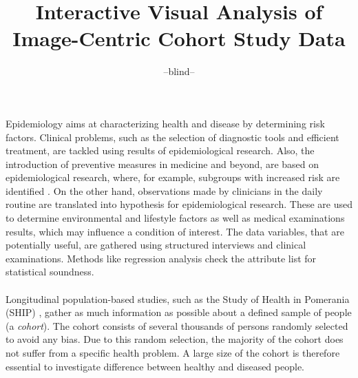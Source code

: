 \documentclass[journal]{style/vgtc} 			          %
\title{Interactive Visual Analysis of Image-Centric Cohort Study Data}
\author{--blind--}
\begin{document}


\maketitle

Epidemiology aims at characterizing health and disease by determining risk factors.
%
Clinical problems, such as the selection of diagnostic tools and efficient treatment, are tackled using results of epidemiological research.
%
Also, the introduction of preventive measures in medicine and beyond, are based on epidemiological research, where, for example, subgroups with increased risk are identified \cite{Fletcher2012}.
%
On the other hand, observations made by clinicians in the daily routine are translated into hypothesis for epidemiological research.
%
These are used to determine environmental and lifestyle factors as well as medical examinations results, which may influence a condition of interest.
%
The data variables, that are potentially useful, are gathered using structured interviews and clinical examinations.
%
Methods like regression analysis check the attribute list for statistical soundness.
%
\\\\
Longitudinal population-based studies, such as the Study of Health in Pomerania (SHIP) \cite{Volzke2011}, gather as much information as possible about a defined sample of people (a \emph{cohort}).
%
The cohort consists of several thousands of persons randomly selected to avoid any bias.
%
Due to this random selection, the majority of the cohort does not suffer from a specific health problem.
%
A large size of the cohort is therefore essential to investigate difference between healthy and diseased people.
%
\end{document}
